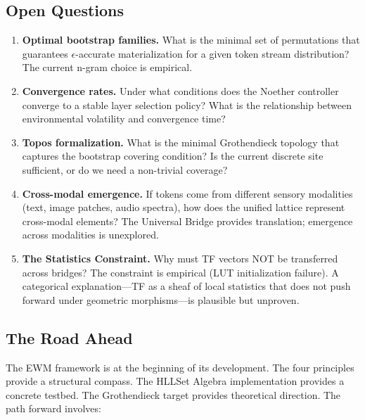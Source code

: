 \documentclass[11pt,a4paper]{article}
\theoremstyle{remark}
\begin{document}
\subsection{Open Questions}

\begin{enumerate}[leftmargin=*,nosep]
  \item \textbf{Optimal bootstrap families.} What is the minimal set of permutations
    that guarantees $\epsilon$-accurate materialization for a given token stream
    distribution? The current n-gram choice is empirical.
  \item \textbf{Convergence rates.} Under what conditions does the Noether controller
    converge to a stable layer selection policy? What is the relationship between
    environmental volatility and convergence time?
  \item \textbf{Topos formalization.} What is the minimal Grothendieck topology that
    captures the bootstrap covering condition? Is the current discrete site sufficient,
    or do we need a non-trivial coverage?
  \item \textbf{Cross-modal emergence.} If tokens come from different sensory modalities
    (text, image patches, audio spectra), how does the unified lattice represent
    cross-modal elements? The Universal Bridge provides translation; emergence across
    modalities is unexplored.
  \item \textbf{The Statistics Constraint.} Why must TF vectors NOT be transferred
    across bridges? The constraint is empirical (LUT initialization failure). A
    categorical explanation---TF as a sheaf of local statistics that does not push
    forward under geometric morphisms---is plausible but unproven.
\end{enumerate}

\subsection{The Road Ahead}

The EWM framework is at the beginning of its development. The four principles provide
a structural compass. The HLLSet Algebra implementation provides a concrete testbed.
The Grothendieck target provides theoretical direction. The path forward involves:
\end{document}
